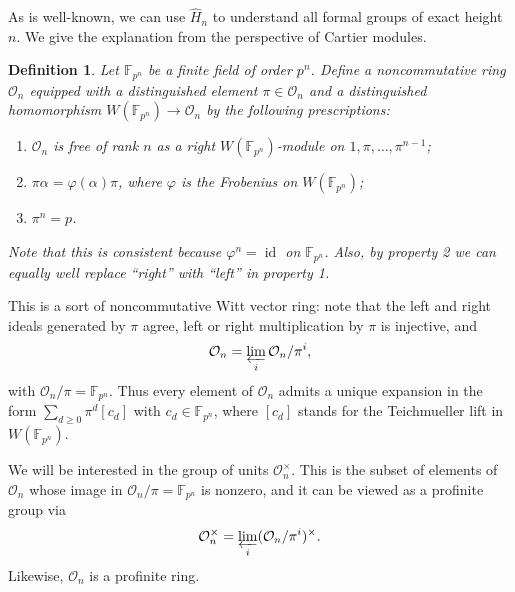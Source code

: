 \documentclass[12pt]{article}
\newtheorem{definition}[theorem]{Definition}
\newcommand{\on}{\operatorname}
\begin{document}
As is well-known, we can use $\widehat{H}_n$ to understand all formal groups of exact height $n$.  We give the explanation from the perspective of Cartier modules.

\begin{definition}
Let $\mathbb{F}_{p^n}$ be a finite field of order $p^n$.  Define a noncommutative ring $\mathcal{O}_n$ equipped with a distinguished element $\pi\in \mathcal{O}_n$ and a distinguished homomorphism $W(\mathbb{F}_{p^n})\to \mathcal{O}_n$ by the following prescriptions:
\begin{enumerate}
\item $\mathcal{O}_n$ is free of rank $n$ as a right $W(\mathbb{F}_{p^n})$-module on $1,\pi,\ldots,\pi^{n-1}$;
\item $\pi \alpha = \varphi(\alpha)\pi$, where $\varphi$ is the Frobenius on $W(\mathbb{F}_{p^n})$;
\item $\pi^n=p$.
\end{enumerate}
Note that this is consistent because $\varphi^n=\on{id}$ on $\mathbb{F}_{p^n}$.  Also, by property 2 we can equally well replace ``right'' with ``left'' in property 1.
\end{definition}

This is a sort of noncommutative Witt vector ring: note that the left and right ideals generated by $\pi$ agree, left or right multiplication by $\pi$ is injective, and
$$\mathcal{O}_n = \varprojlim_i \mathcal{O}_n/\pi^i,$$
with $\mathcal{O}_n/\pi=\mathbb{F}_{p^n}$.  Thus every element of $\mathcal{O}_n$ admits a unique expansion in the form $\sum_{d\geq 0} \pi^d [c_d]$ with $c_d\in\mathbb{F}_{p^n}$, where $[c_d]$ stands for the Teichmueller lift in $W(\mathbb{F}_{p^n})$.

We will be interested in the group of units $\mathcal{O}_n^\times$.  This is the subset of elements of $\mathcal{O}_n$ whose image in $\mathcal{O}_n/\pi=\mathbb{F}_{p^n}$ is nonzero, and it can be viewed as a profinite group via
$$\mathcal{O}_n^\times = \varprojlim_i (\mathcal{O}_n/\pi^i)^\times.$$
Likewise, $\mathcal{O}_n$ is a profinite ring.
\end{document}
